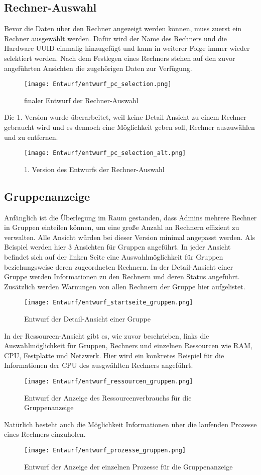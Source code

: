 \documentclass{report}
\begin{document}
\subsection{Rechner-Auswahl}
Bevor die Daten über den Rechner angezeigt werden können, muss zuerst ein Rechner ausgewählt werden. Dafür wird der Name des Rechners und die Hardware UUID einmalig hinzugefügt und kann in weiterer Folge immer wieder selektiert werden. Nach dem Festlegen eines Rechners stehen auf den zuvor angeführten Ansichten die zugehörigen Daten zur Verfügung.
\begin{figure}[H]
    \centering
    \texttt{[image: Entwurf/entwurf\_pc\_selection.png]}
    \caption{finaler Entwurf der Rechner-Auswahl}
\end{figure}
\noindent Die 1. Version wurde überarbeitet, weil keine Detail-Ansicht zu einem Rechner gebraucht wird und es dennoch eine Möglichkeit geben soll, Rechner auszuwählen und zu entfernen.
\begin{figure}[H]
    \centering
    \texttt{[image: Entwurf/entwurf\_pc\_selection\_alt.png]}
    \caption{1. Version des Entwurfs der Rechner-Auswahl}
\end{figure}

\subsection{Gruppenanzeige}
Anfänglich ist die Überlegung im Raum gestanden, dass Admins mehrere Rechner in Gruppen einteilen können, um eine große Anzahl an Rechnern effizient zu verwalten. Alle Ansicht würden bei dieser Version minimal angepasst werden. Als Beispiel werden hier 3 Ansichten für Gruppen angeführt.
In jeder Ansicht befindet sich auf der linken Seite eine Auswahlmöglichkeit für Gruppen beziehungsweise deren zugeordneten Rechnern. In der Detail-Ansicht einer Gruppe werden Informationen zu den Rechnern und deren Status angeführt. Zusätzlich werden Warnungen von allen Rechnern der Gruppe hier aufgelistet.
\begin{figure}[H]
    \centering
    \texttt{[image: Entwurf/entwurf\_startseite\_gruppen.png]}
    \caption{Entwurf der Detail-Ansicht einer Gruppe}
\end{figure}
\noindent In der Ressourcen-Ansicht gibt es, wie zuvor beschrieben, links die Auswahlmöglichkeit für Gruppen, Rechners und einzelnen Ressourcen wie RAM, CPU, Festplatte und Netzwerk. Hier wird ein konkretes Beispiel für die Informationen der CPU des ausgwählten Rechners angeführt.
\begin{figure}[H]
    \centering
    \texttt{[image: Entwurf/entwurf\_ressourcen\_gruppen.png]}
    \caption{Entwurf der Anzeige des Ressourcenverbrauchs für die Gruppenanzeige}
\end{figure}
\noindent Natürlich besteht auch die Möglichkeit Informationen über die laufenden Prozesse eines Rechners einzuholen.
\begin{figure}[H]
    \centering
    \texttt{[image: Entwurf/entwurf\_prozesse\_gruppen.png]}
    \caption{Entwurf der Anzeige der einzelnen Prozesse für die Gruppenanzeige}
\end{figure}
\end{document}
